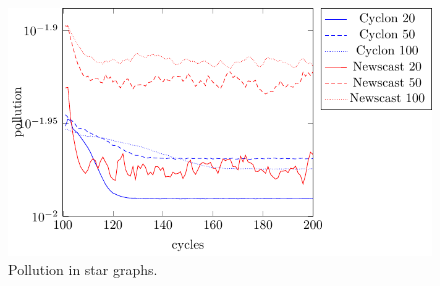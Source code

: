 \documentclass[a4paper]{ifacconf}
\begin{document}
\begin{figure}[p]
    \centering
    \includegraphics[width=.9\linewidth]{"figures/pollution/pollution star"}
    \caption{Pollution in star graphs.}
    \label{fig:pollution-star}
\end{figure}
\end{document}
